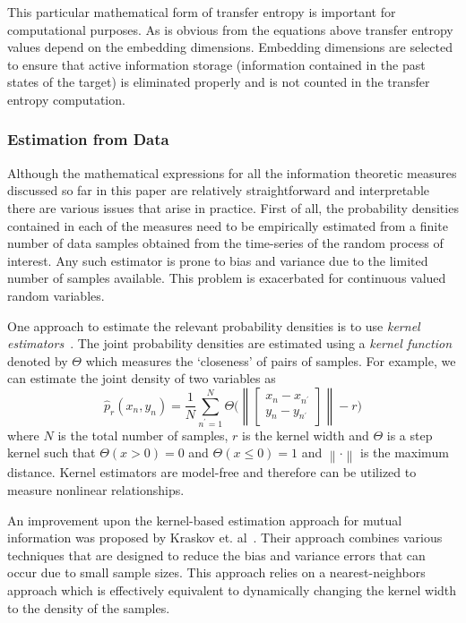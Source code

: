 \documentclass[12pt]{article}
\newcommand{\norm}[1]{\left\lVert#1\right\rVert}
\begin{document}
This particular mathematical form of transfer entropy is important for computational purposes. As is obvious from the equations above transfer entropy values depend on the embedding dimensions. Embedding dimensions are selected to ensure that active information storage (information contained in the past states of the target) is eliminated properly and is not counted in the transfer entropy computation. 

\subsubsection{Estimation from Data}

Although the mathematical expressions for all the information theoretic measures discussed so far in this paper are relatively straightforward and interpretable there are various issues that arise in practice. First of all, the probability densities contained in each of the measures need to be empirically estimated from a finite number of data samples obtained from the time-series of the random process of interest. Any such estimator is prone to bias and variance due to the limited number of samples available. This problem is exacerbated for continuous valued random variables.

One approach to estimate the relevant probability densities is to use \textit{kernel estimators}~\cite{silverman1986density}. The joint probability densities are estimated using a \textit{kernel function} denoted by $\Theta$ which measures the `closeness' of pairs of samples. For example, we can estimate the joint density of two variables as 
\begin{equation*}
\hat{p}_r(x_n, y_n) = \frac{1}{N}\sum_{n^{\prime} = 1}^{N}\Theta\Bigg(\norm{\begin{bmatrix}
	x_n - x_{n^{\prime}} \\
	y_n - y_{n^{\prime}}
	\end{bmatrix}}-r\Bigg)
\end{equation*}  
where $N$ is the total number of samples, $r$ is the kernel width and $\Theta$ is a step kernel such that $\Theta(x > 0) = 0$ and $\Theta(x \leq 0) = 1$ and $\norm{\cdot}$ is the maximum distance. Kernel estimators are model-free and therefore can be utilized to measure nonlinear relationships. 

An improvement upon the kernel-based estimation approach for mutual information was proposed by Kraskov et. al~\cite{kraskov2004estimating}. Their approach combines various techniques that are designed to reduce the bias and variance errors that can occur due to small sample sizes. This approach relies on a nearest-neighbors approach which is effectively equivalent to dynamically changing the kernel width to the density of the samples. 
\end{document}
